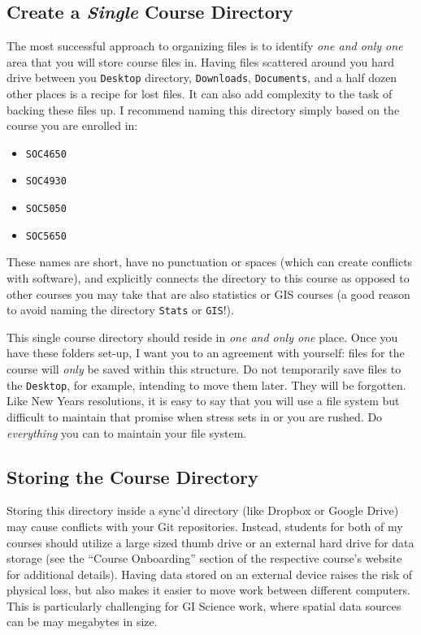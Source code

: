 \documentclass[]{book}
\providecommand{\tightlist}{%
  \setlength{\itemsep}{0pt}\setlength{\parskip}{0pt}}
\theoremstyle{definition}
\theoremstyle{definition}
\theoremstyle{definition}
\theoremstyle{remark}
\begin{document}
\subsection{\texorpdfstring{Create a \emph{Single} Course
Directory}{Create a Single Course Directory}}\label{create-a-single-course-directory}

The most successful approach to organizing files is to identify
\emph{one and only one} area that you will store course files in. Having
files scattered around you hard drive between you \texttt{Desktop}
directory, \texttt{Downloads}, \texttt{Documents}, and a half dozen
other places is a recipe for lost files. It can also add complexity to
the task of backing these files up. I recommend naming this directory
simply based on the course you are enrolled in:

\begin{itemize}
\tightlist
\item
  \texttt{SOC4650}
\item
  \texttt{SOC4930}
\item
  \texttt{SOC5050}
\item
  \texttt{SOC5650}
\end{itemize}

These names are short, have no punctuation or spaces (which can create
conflicts with software), and explicitly connects the directory to this
course as opposed to other courses you may take that are also statistics
or GIS courses (a good reason to avoid naming the directory
\texttt{Stats} or \texttt{GIS}!).

This single course directory should reside in \emph{one and only one}
place. Once you have these folders set-up, I want you to an agreement
with yourself: files for the course will \emph{only} be saved within
this structure. Do not temporarily save files to the \texttt{Desktop},
for example, intending to move them later. They will be forgotten. Like
New Years resolutions, it is easy to say that you will use a file system
but difficult to maintain that promise when stress sets in or you are
rushed. Do \emph{everything} you can to maintain your file system.

\subsection{Storing the Course
Directory}\label{storing-the-course-directory}

Storing this directory inside a sync'd directory (like Dropbox or Google
Drive) may cause conflicts with your Git repositories. Instead, students
for both of my courses should utilize a large sized thumb drive or an
external hard drive for data storage (see the ``Course Onboarding''
section of the respective course's website for additional details).
Having data stored on an external device raises the risk of physical
loss, but also makes it easier to move work between different computers.
This is particularly challenging for GI Science work, where spatial data
sources can be may megabytes in size.
\end{document}

